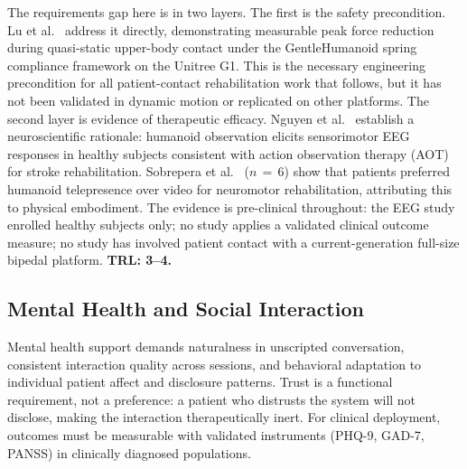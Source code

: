 \documentclass[acmsmall]{acmart}
\begin{document}
The requirements gap here is in two layers. The first is the safety precondition.
Lu et al.~\cite{lu2025gentlehumanoid} address it directly, demonstrating
measurable peak force reduction during quasi-static upper-body contact under the
GentleHumanoid spring compliance framework on the Unitree G1. This is the
necessary engineering precondition for all patient-contact rehabilitation work
that follows, but it has not been validated in dynamic motion or replicated on
other platforms. The second layer is evidence of therapeutic efficacy. Nguyen et
al.~\cite{nguyen2024eeg} establish a neuroscientific rationale: humanoid
observation elicits sensorimotor EEG responses in healthy subjects consistent with
action observation therapy (AOT) for stroke rehabilitation. Sobrepera et
al.~\cite{sobrepera2022feasibility} ($n\,=\,6$) show that patients preferred
humanoid telepresence over video for neuromotor rehabilitation, attributing this
to physical embodiment. The evidence is pre-clinical throughout: the EEG study
enrolled healthy subjects only; no study applies a validated clinical outcome
measure; no study has involved patient contact with a current-generation full-size
bipedal platform. \textbf{TRL: 3--4.}

\subsection{Mental Health and Social Interaction}
\label{sec:mentalhealth}

Mental health support demands naturalness in unscripted conversation, consistent
interaction quality across sessions, and behavioral adaptation to individual
patient affect and disclosure patterns. Trust is a functional requirement, not a
preference: a patient who distrusts the system will not disclose, making the
interaction therapeutically inert. For clinical deployment, outcomes must be
measurable with validated instruments (PHQ-9, GAD-7, PANSS) in clinically
diagnosed populations.
\end{document}
